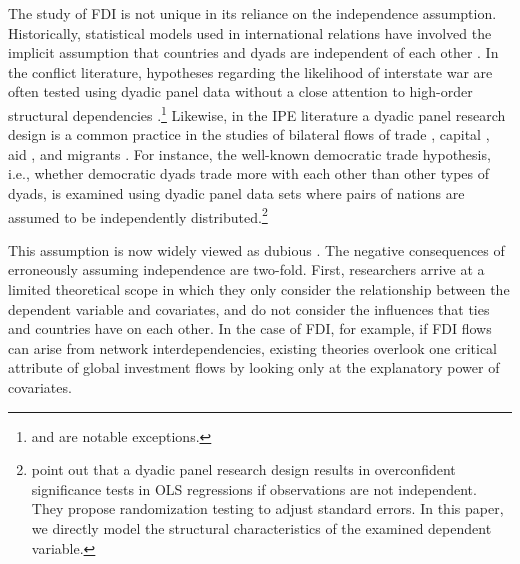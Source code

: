 \documentclass[reqno,onecolumn,letterpaper,12pt]{article}
\begin{document}
The study of FDI is not unique in its reliance on the independence assumption. Historically, statistical models used in international relations have involved the implicit assumption that countries and dyads are independent of each other \citep{diehl2016conditional,ward2007persistent}. In the conflict literature, hypotheses regarding the likelihood of interstate war are often tested using dyadic panel data without a close attention to high-order structural dependencies \citep[e.g.,][]{Cranmer_Desmarais:2011}.\footnote{\citet{ward2007disputes} and \citet{ward2007persistent} are notable exceptions.} Likewise, in the IPE literature a dyadic panel research design is a common practice in the studies of bilateral flows of trade \citep[e.g.,][]{Mansfield_et_al:2000,Rose:2004,Goldstein_et_al:2007,Bliss_Russett:1998,Gowa_Mansfield:1993}, capital \citep[e.g.,][]{Li_Vashchilko:2010,Leblang:2010,Egger_Pfaffermayr:2004}, aid \citep[e.g.,][]{BDM_Smith:2009}, and migrants \citep[e.g.,][]{Fitzgerald_et_al:2014}. For instance, the well-known democratic trade hypothesis, i.e., whether democratic dyads trade more with each other than other types of dyads, is examined using dyadic panel data sets where pairs of nations are assumed to be independently distributed.\footnote{\citet{Erikson_et_al:2014} point out that a dyadic panel research design results in overconfident significance tests in OLS regressions if observations are not independent. They propose randomization testing to adjust standard errors. In this paper, we directly model the structural characteristics of the examined dependent variable. }


This assumption is now widely viewed as dubious \citep[see, e.g., ][]{ward2007persistent, chu2010homogenization,cranmer2016critique,dorff2013networks,lee2013network,howell2013geography,kinne2016agreeing,Franzese_et_al:2012,Hays_et_al:2010}. The negative consequences of erroneously assuming independence are two-fold.
First, researchers arrive at a limited theoretical scope in which they only consider the relationship between the dependent variable and covariates, and do not consider the influences that ties and countries have on each other. In the case of FDI, for example, if FDI flows can arise from network interdependencies, existing theories overlook one critical attribute of global investment flows by looking only at the explanatory power of covariates.
\end{document}
